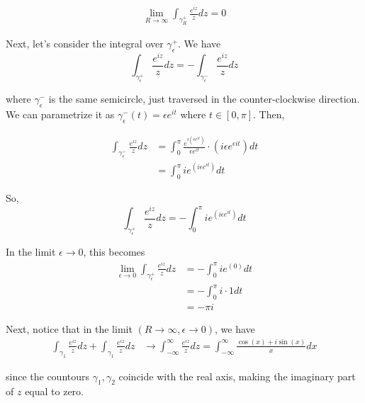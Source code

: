 \documentclass{article}
\begin{document}
\begin{align*}
  \lim_{R \rightarrow \infty} \int_{{\gamma}_{R}^{+}} \frac{e^{iz}}{z} dz = 0 
\end{align*}

\vskip 0.5cm
Next, let's consider the integral over ${\gamma}_{\epsilon}^{+}$. We have 
\[ \int_{{\gamma}_{\epsilon}^{+}} \frac{e^{iz}}{z} dz = - \int_{{\gamma}_{\epsilon}^{-}} \frac{e^{iz}}{z} dz \]

where ${\gamma}_{\epsilon}^{-}$ is the same semicircle, just traversed in the counter-clockwise direction. We can parametrize it as ${\gamma}_{\epsilon}^{-}(t) = \epsilon e^{it}$ where $t \in [0, \pi]$. Then,

\begin{align*}
  \int_{{\gamma}_{\epsilon}^{-}} \frac{e^{iz}}{z} dz &= \int_{0}^{\pi} \frac{e^{i \left(\epsilon e^{it}\right)}}{\epsilon e^{it}} \cdot \left( i \epsilon e^{\epsilon it} \right) dt \\
  &= \int_{0}^{\pi} ie^{\left(i\epsilon e^{it}\right)} dt
\end{align*}

So, 
\[ \int_{{\gamma}_{\epsilon}^{+}} \frac{e^{iz}}{z} dz = - \int_{0}^{\pi} ie^{\left(i\epsilon e^{it}\right)} dt \]

In the limit $\epsilon \rightarrow 0$, this becomes 
\begin{align*}
  \lim_{\epsilon \rightarrow 0} \int_{{\gamma}_{\epsilon}^{+}} \frac{e^{iz}}{z} dz &= - \int_{0}^{\pi} ie^{\left(0\right)} dt \\
  &= - \int_{0}^{\pi} i \cdot 1 dt \\
  &= - \pi i
\end{align*}

\vskip 0.5cm
Next, notice that in the limit $\left(R \rightarrow \infty, \epsilon \rightarrow 0\right)$, we have 
\begin{align*}
  \int_{{\gamma_{1}}} \frac{e^{iz}}{z} dz + \int_{{\gamma_{1}}} \frac{e^{iz}}{z} dz &\rightarrow \int_{-\infty}^{\infty} \frac{e^{iz}}{z} dz = \int_{-\infty}^{\infty} \frac{\cos(x) + i\sin(x)}{x} dx
\end{align*}

since the countours $\gamma_1, \gamma_2$ coincide with the real axis, making the imaginary part of $z$ equal to zero.
\end{document}
